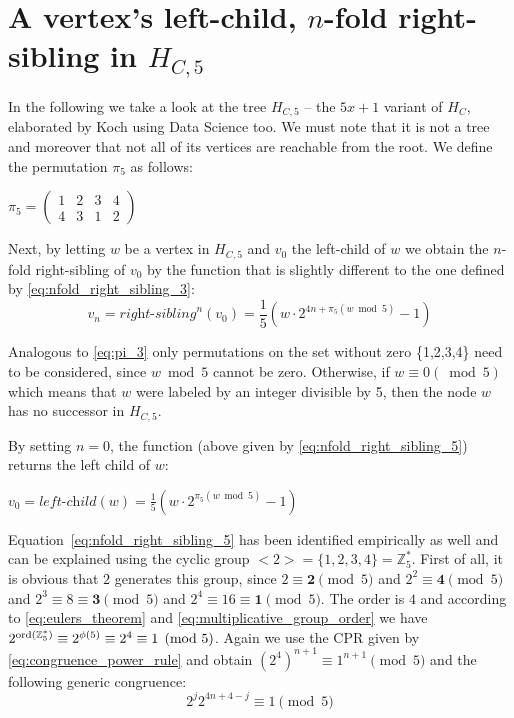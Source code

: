 \section{\texorpdfstring{A vertex's left-child, $n$-fold right-sibling in $H_{C,5}$}{A vertex's left-child, n-fold right-sibling in HC5}}
\label{sec:left_child_right_sibling_5}

In the following we take a look at the tree $H_{C,5}$ -- the $5x+1$ variant of $H_C$, elaborated by Koch \cite{Ref_Koch_Github} using Data Science too. We must note that it is not a tree and moreover that not all of its vertices are reachable from the root. We define the permutation $\pi_5$ as follows:
\begin{center}
\label{eq:pi_5}
    $\pi_5=\left(\begin{array}{cccc}
    	1 & 2 & 3 & 4\\
    	4 & 3 & 1 & 2
    \end{array}\right)$	
\end{center}

Next, by letting $w$ be a vertex in $H_{C,5}$ and $v_0$ the left-child of $w$
we obtain the $n$-fold right-sibling of $v_0$ by the function that
is slightly different to the one defined by \ref{eq:nfold_right_sibling_3}:
\begin{equation}
\label{eq:nfold_right_sibling_5}
    v_n=\textit{right-sibling}^n(v_0)=\frac{1}{5}\left(w\cdot2^{4n+\pi_5(w\bmod 5)}-1\right)
\end{equation}

Analogous to \ref{eq:pi_3} only permutations on the set without zero
\{1,2,3,4\} need to be considered, since $w\bmod 5$ cannot be zero.
Otherwise, if $w\equiv 0 (\bmod 5)$ which means that $w$ were labeled
by an integer divisible by 5, then the node $w$ has no successor in $H_{C,5}$.

\noindent
By setting $n=0$, the function (above given by \ref{eq:nfold_right_sibling_5}) returns the left child of $w$:
\begin{center}
	$v_0=\textit{left-child}(w)=\frac{1}{5}\left(w\cdot2^{\pi_5(w\bmod 5)}-1\right)$
\end{center}

Equation~\ref{eq:nfold_right_sibling_5} has been identified empirically as well and can be explained using the cyclic group $<2>=\{1,2,3,4\}=\mathbb{Z}_5^\ast$. First of all, it is obvious that $2$ generates this group, since $2\equiv\boldsymbol{2}\pmod5$ and $2^2\equiv\boldsymbol{4}\pmod5$ and $2^3\equiv8\equiv\boldsymbol{3}\pmod5$ and $2^4\equiv16\equiv\boldsymbol{1}\pmod5$. The order is $4$ and according to \ref{eq:eulers_theorem} and \ref{eq:multiplicative_group_order} we have $2^{\operatorname{ord}(\mathbb{Z}_5^\ast)}\equiv2^{\phi(5)}\equiv2^4\equiv1\pmod5$. Again we use the CPR given by \ref{eq:congruence_power_rule} and obtain $(2^4)^{n+1}\equiv1^{n+1}\pmod5$ and the following generic congruence:
\begin{equation}
\label{eq:congruence_k5}
2^j2^{4n+4-j}\equiv1\pmod5
\end{equation}

